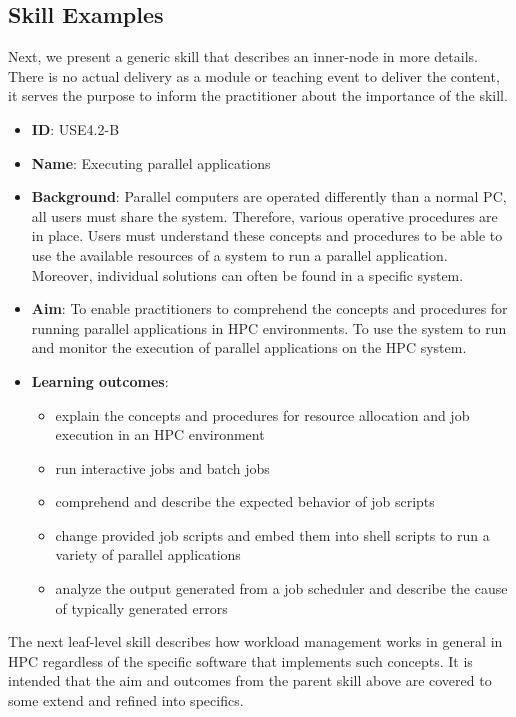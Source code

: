 \documentclass[jocse]{jocseart}
\begin{document}
\subsection{Skill Examples}

Next, we present a generic skill that describes an inner-node in more details.
There is no actual delivery as a module or teaching event to deliver the content, it serves the purpose to inform the practitioner about the importance of the skill.

\begin{itemize}
  \item \textbf{ID}: USE4.2-B
  \item \textbf{Name}: Executing parallel applications
  \item \textbf{Background}:
  Parallel computers are operated differently than a normal PC, all users must share the system. Therefore, various operative procedures are in place. Users must understand these concepts and procedures to be able to use the available resources of a system to run a parallel application. Moreover, individual solutions can often be found in a specific system.
  \item \textbf{Aim}: To enable practitioners to comprehend the concepts and procedures for running parallel applications in HPC environments.
  To use the system to run and monitor the execution of parallel applications on the HPC system.

  \item \textbf{Learning outcomes}:
    \begin{itemize}
    \item explain the concepts and procedures for resource allocation and job execution in an HPC environment
    \item run interactive jobs and batch jobs
    \item comprehend and describe the expected behavior of job scripts
    \item change provided job scripts and embed them into shell scripts to run a variety of parallel applications
    \item analyze the output generated from a job scheduler and describe the cause of typically generated errors
    \end{itemize}
\end{itemize}

The next leaf-level skill describes how workload management works in general in HPC regardless of the specific software that implements such concepts.
It is intended that the aim and outcomes from the parent skill above are covered to some extend and refined into specifics.
\end{document}

